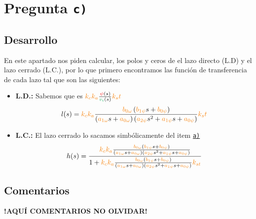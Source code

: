 \section{Pregunta \texttt{c)}}\label{pregunta-c}
\subsection{Desarrollo}

En este apartado nos piden calcular, los polos y ceros de el lazo directo (L.D) 
y el lazo cerrado (L.C.), por lo que primero encontramos las función de 
transferencia de cada lazo tal que son las siguientes:

\begin{itemize}
    \item \textbf{L.D.:} Sabemos que es \( \nara{k_c k_a} \frac{\rojo{\psi}(s)}{\verd{v_i}(s)}\nara{k_st} \)
    \begin{equation}
        l(s)= \nara{k_ck_a} \frac{\nara{\nara{b_{0\omega}}}\left(\nara{b_{1\psi}}s + \nara{b_{0\psi}}\right)}
        {\left(\nara{a_{1\omega}}s + \nara{a_{0\omega}}\right)\left(\nara{a_{2\psi}}s^{2} + \nara{a_{1\psi}}s + \nara{a_{0\psi}}\right)} \nara{k_st}
    \end{equation}
\end{itemize}

\begin{itemize}
    \item \textbf{L.C.:} El lazo cerrado lo sacamos simbólicamente del item \hyperref[pregunta-a]{\texttt{a)}}
    \begin{equation}
        h(s)= \dfrac{\nara{k_ck_a} \frac{\nara{\nara{b_{0\omega}}}\left(\nara{b_{1\psi}}s + \nara{b_{0\psi}}\right)}
        {\left(\nara{a_{1\omega}}s + \nara{a_{0\omega}}\right)\left(\nara{a_{2\psi}}s^{2} + \nara{a_{1\psi}}s + \nara{a_{0\psi}}\right)}}{1+\nara{k_ck_a} \frac{\nara{\nara{b_{0\omega}}}\left(\nara{b_{1\psi}}s + \nara{b_{0\psi}}\right)}
        {\left(\nara{a_{1\omega}}s + \nara{a_{0\omega}}\right)\left(\nara{a_{2\psi}}s^{2} + \nara{a_{1\psi}}s + \nara{a_{0\psi}}\right)}\nara{k_{st}}}
    \end{equation}
\end{itemize}



\FloatBarrier
\subsection{Comentarios}


\textbf{!AQUÍ COMENTARIOS NO OLVIDAR!}


